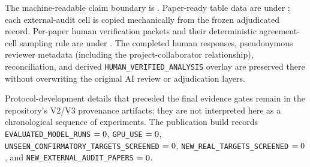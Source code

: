 \documentclass[10pt]{article}
\begin{document}
The machine-readable claim boundary is
.  Paper-ready table data are under
; each external-audit cell is copied mechanically from the
frozen adjudicated record.  Per-paper human verification packets and their
deterministic agreement-cell sampling rule are under
.  The completed human responses, pseudonymous
reviewer metadata (including the project-collaborator relationship),
reconciliation, and derived
\texttt{HUMAN\_VERIFIED\_ANALYSIS} overlay are preserved there without
overwriting the original AI review or adjudication layers.

Protocol-development details that preceded the final evidence gates remain in
the repository's V2/V3 provenance artifacts; they are not interpreted here as
a chronological sequence of experiments.  The publication build records
\texttt{EVALUATED\_MODEL\_RUNS} \(=0\),
\texttt{GPU\_USE} \(=0\),
\texttt{UNSEEN\_CONFIRMATORY\_TARGETS\_SCREENED}
\(=0\),
\texttt{NEW\_REAL\_TARGETS\_SCREENED} \(=0\), and
\texttt{NEW\_EXTERNAL\_AUDIT\_PAPERS} \(=0\).



\end{document}
